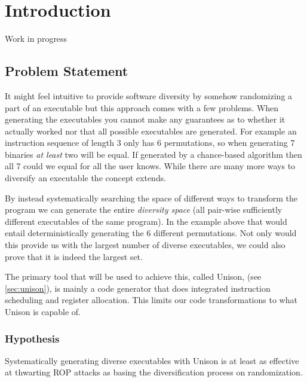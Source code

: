 \chapter{Introduction}

Work in progress

\section{Problem Statement}

It might feel intuitive to provide software diversity by somehow randomizing a part of an
executable but this approach comes with a few problems. When generating the executables
you cannot make any guarantees as to whether it actually worked nor that all possible executables
are generated. For example an instruction sequence of length 3 only has 6 permutations, so
when generating 7 binaries \textit{at least} two will be equal. If generated by a chance-based
algorithm then all 7 could we equal for all the user knows. While there are many more ways
to diversify an executable the concept extends.

By instead systematically searching the space of different ways to transform the program
we can generate the entire \textit{diversity space} (all pair-wise sufficiently different
executables of the same program). In the example above that would entail deterministically
generating the 6 different permutations. Not only would this provide us with the largest
number of diverse executables, we could also prove that it is indeed the largest set.

The primary tool that will be used to achieve this, called Unison, (see \ref{sec:unison}),
is mainly a code generator that does integrated instruction scheduling and register
allocation. This limits our code transformations to what Unison is capable of.

\subsection{Hypothesis}

Systematically generating diverse executables with Unison is at least as effective at
thwarting ROP attacks as basing the diversification process on randomization.
